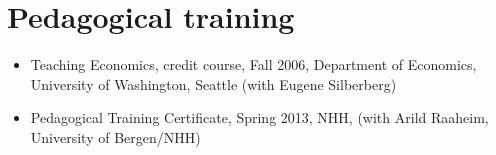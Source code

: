 \documentclass[margin]{res}
\begin{document}
\section{Pedagogical training}
\begin{itemize}
\setlength{\itemsep}{10pt}
\item[] Teaching Economics, credit course, Fall 2006, Department of Economics, University of Washington, Seattle (with Eugene Silberberg)

\item[] Pedagogical Training Certificate, Spring 2013, NHH, (with Arild Raaheim, University of Bergen/NHH)
\end{itemize}
\end{document}
